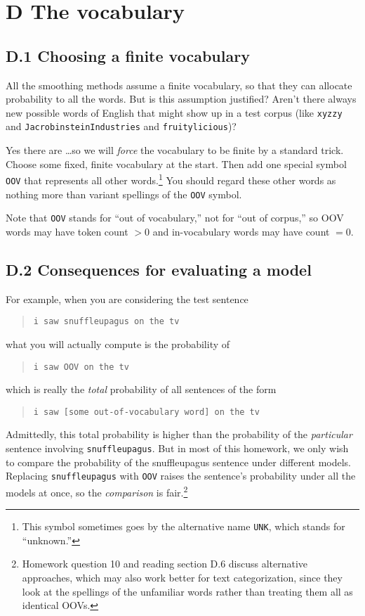 \documentclass[12pt]{article}
\theoremstyle{plain}
\theoremstyle{definition}
\theoremstyle{remark}
\begin{document}
\section*{D The vocabulary}
\subsection*{D.1 Choosing a finite vocabulary}
All the smoothing methods assume a finite vocabulary, so that they can allocate probability to all the words. But is this assumption justified? Aren’t there always new possible words of English that might show up in a test corpus (like \texttt{xyzzy} and \texttt{JacrobinsteinIndustries} and \texttt{fruitylicious})?

Yes there are \ldots so we will \textit{force} the vocabulary to be finite by a standard trick. Choose some fixed, finite vocabulary at the start. Then add one special symbol \texttt{OOV} that represents all other words.\footnote{This symbol sometimes goes by the alternative name \texttt{UNK}, which stands for “unknown.”} You should regard these other words as nothing more than variant spellings of the \texttt{OOV} symbol.

Note that \texttt{OOV} stands for “out of vocabulary,” not for “out of corpus,” so OOV words may have token count $> 0$ and in-vocabulary words may have count $= 0$.

\subsection*{D.2 Consequences for evaluating a model}
For example, when you are considering the test sentence
\begin{quote}
\texttt{i saw snuffleupagus on the tv}
\end{quote}
what you will actually compute is the probability of
\begin{quote}
\texttt{i saw OOV on the tv}
\end{quote}
which is really the \textit{total} probability of all sentences of the form
\begin{quote}
\texttt{i saw [some out-of-vocabulary word] on the tv}
\end{quote}

Admittedly, this total probability is higher than the probability of the \textit{particular} sentence involving \texttt{snuffleupagus}. But in most of this homework, we only wish to compare the probability of the snuffleupagus sentence under different models. Replacing \texttt{snuffleupagus} with \texttt{OOV} raises the sentence’s probability under all the models at once, so the \textit{comparison} is fair.\footnote{Homework question 10 and reading section D.6 discuss alternative approaches, which may also work better for text categorization, since they look at the spellings of the unfamiliar words rather than treating them all as identical OOVs.}
\end{document}

